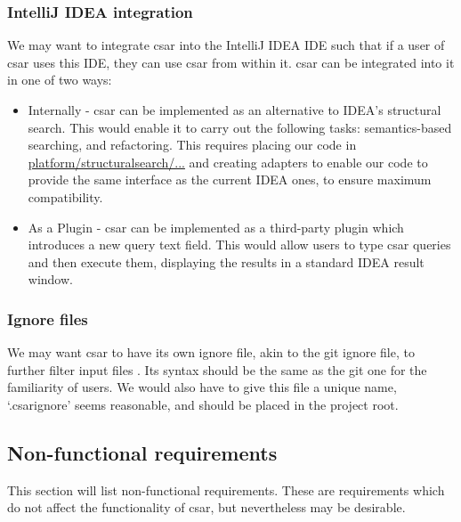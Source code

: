 \documentclass[12pt, letterpaper]{article}
\begin{document}
\subsubsection{IntelliJ IDEA integration}
We may want to integrate csar into the IntelliJ IDEA IDE such that if a user of csar uses this IDE, they can use csar from within it. 
csar can be integrated into it in one of two ways:
\begin{itemize}
  \item Internally - csar can be implemented as an alternative to IDEA's structural search.
  This would enable it to carry out the following tasks: semantics-based searching, and refactoring.
  This requires placing our code in \href{https://github.com/JetBrains/intellij-community/tree/master/platform/structuralsearch/source/com/intellij/structuralsearch}{platform/structuralsearch/...} and creating adapters to enable our code to provide the same interface as the current IDEA ones, to ensure maximum compatibility.
  \item As a Plugin - csar can be implemented as a third-party plugin which introduces a new query text field.
  This would allow users to type csar queries and then execute them, displaying the results in a standard IDEA result window.
\end{itemize}

\subsubsection{Ignore files}
We may want csar to have its own ignore file, akin to the git ignore file, to further filter input files \autocite{gitscmgitignore}.
Its syntax should be the same as the git one for the familiarity of users.
We would also have to give this file a unique name, `.csarignore' seems reasonable, and should be placed in the project root.

\subsection{Non-functional requirements}
\label{sec:NonFunctionalRequirements}
This section will list non-functional requirements.
These are requirements which do not affect the functionality of csar, but nevertheless may be desirable.
\end{document}
